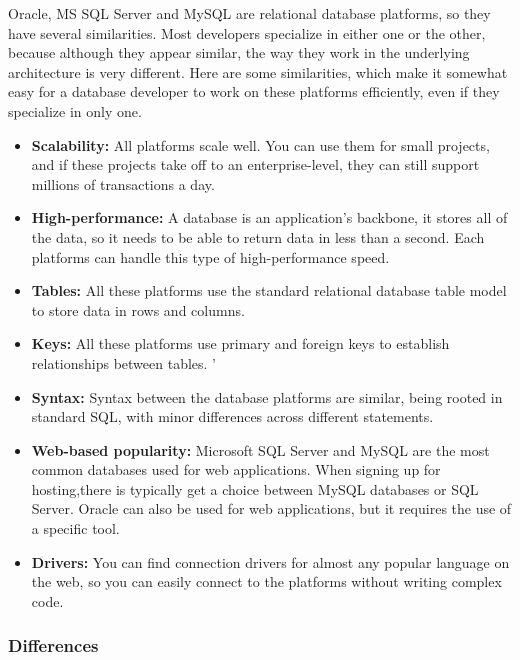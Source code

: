 Oracle, MS SQL Server and MySQL are relational database platforms, so they have several similarities. Most developers specialize in either one or the other, because although they appear similar, the way they work in the underlying architecture is very different. Here are some similarities, which make it somewhat easy for a database developer to work on these platforms efficiently, even if they specialize in only one.
\begin{itemize}
    \item \textbf{Scalability:} All platforms scale well. You can use them for small projects, and if these projects take off to an enterprise-level, they can still support millions of transactions a day.
    
    \item \textbf{High-performance:} A database is an application’s backbone, it stores all of the data, so it needs to be able to return data in less than a second. Each platforms can handle this type of high-performance speed.
    
    \item \textbf{Tables:} All these platforms use the standard relational database table model to store data in rows and columns.
    
    \item \textbf{Keys:} All these platforms use primary and foreign keys to establish relationships between tables.
    '
    \item \textbf{Syntax:} Syntax between the database platforms are similar, being rooted in standard SQL, with minor differences across different statements.
    
    \item \textbf{Web-based popularity:} Microsoft SQL Server and MySQL are the most common databases used for web applications. When signing up for hosting,there is typically get a choice between MySQL databases or SQL Server. Oracle can also be used for web applications, but it requires the use of a specific tool.
    
    \item \textbf{Drivers:} You can find connection drivers for almost any popular language on the web, so you can easily connect to the platforms without writing complex code.
\end{itemize}

\subsubsection{Differences}

